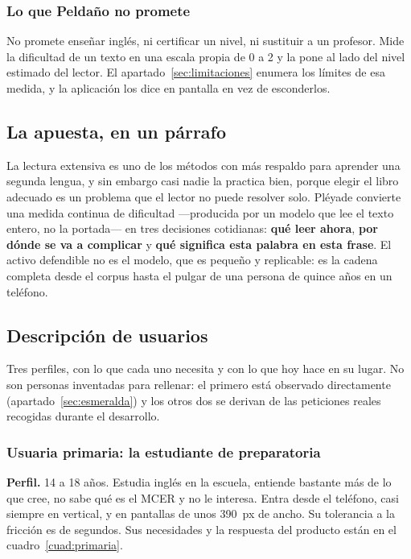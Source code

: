 \documentclass[11pt,a4paper]{article}
\begin{document}
\subsubsection*{Lo que Peldaño no promete}

No promete enseñar inglés, ni certificar un nivel, ni sustituir a un profesor. Mide la
dificultad de un texto en una escala propia de 0 a 2 y la pone al lado del nivel
estimado del lector. El apartado~\ref{sec:limitaciones} enumera los límites de esa
medida, y la aplicación los dice en pantalla en vez de esconderlos.

\subsection{La apuesta, en un párrafo}

La lectura extensiva es uno de los métodos con más respaldo para aprender una segunda
lengua, y sin embargo casi nadie la practica bien, porque elegir el libro adecuado es
un problema que el lector no puede resolver solo. Pléyade convierte una medida
continua de dificultad —producida por un modelo que lee el texto entero, no la
portada— en tres decisiones cotidianas: \textbf{qué leer ahora}, \textbf{por dónde se
va a complicar} y \textbf{qué significa esta palabra en esta frase}. El activo
defendible no es el modelo, que es pequeño y replicable: es la cadena completa desde el
corpus hasta el pulgar de una persona de quince años en un teléfono.

\subsection{Descripción de usuarios}

Tres perfiles, con lo que cada uno necesita y con lo que hoy hace en su lugar. No son
personas inventadas para rellenar: el primero está observado directamente
(apartado~\ref{sec:esmeralda}) y los otros dos se derivan de las peticiones reales
recogidas durante el desarrollo.

\subsubsection{Usuaria primaria: la estudiante de preparatoria}

\textbf{Perfil.} 14 a 18 años. Estudia inglés en la escuela, entiende bastante más de
lo que cree, no sabe qué es el MCER y no le interesa. Entra desde el teléfono, casi
siempre en vertical, y en pantallas de unos 390~px de ancho. Su tolerancia a la
fricción es de segundos. Sus necesidades y la respuesta del producto están en el
cuadro~\ref{cuad:primaria}.
\end{document}
